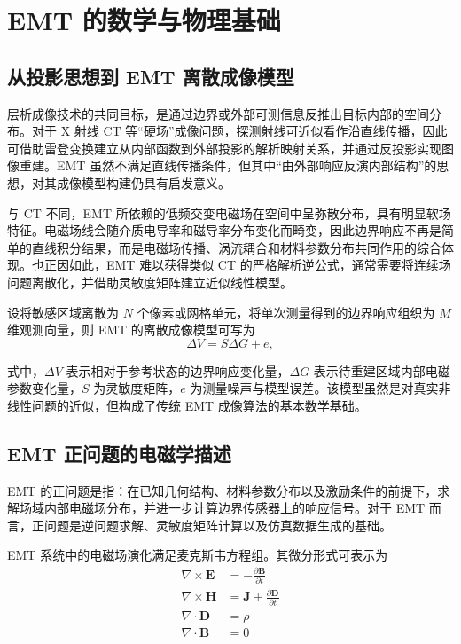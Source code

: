 \section{EMT 的数学与物理基础}

\subsection{从投影思想到 EMT 离散成像模型}

层析成像技术的共同目标，是通过边界或外部可测信息反推出目标内部的空间分布。对于 X 射线 CT 等“硬场”成像问题，探测射线可近似看作沿直线传播，因此可借助雷登变换建立从内部函数到外部投影的解析映射关系，并通过反投影实现图像重建\citep{radon20051}。EMT 虽然不满足直线传播条件，但其中“由外部响应反演内部结构”的思想，对其成像模型构建仍具有启发意义。

与 CT 不同，EMT 所依赖的低频交变电磁场在空间中呈弥散分布，具有明显软场特征。电磁场线会随介质电导率和磁导率分布变化而畸变，因此边界响应不再是简单的直线积分结果，而是电磁场传播、涡流耦合和材料参数分布共同作用的综合体现。也正因如此，EMT 难以获得类似 CT 的严格解析逆公式，通常需要将连续场问题离散化，并借助灵敏度矩阵建立近似线性模型。

设将敏感区域离散为 $N$ 个像素或网格单元，将单次测量得到的边界响应组织为 $M$ 维观测向量，则 EMT 的离散成像模型可写为
\begin{equation}
\label{eqn:EMT_linear}
\Delta V = S\Delta G + e ,
\end{equation}

式中，$\Delta V$ 表示相对于参考状态的边界响应变化量，$\Delta G$ 表示待重建区域内部电磁参数变化量，$S$ 为灵敏度矩阵，$e$ 为测量噪声与模型误差。该模型虽然是对真实非线性问题的近似，但构成了传统 EMT 成像算法的基本数学基础。

\subsection{EMT 正问题的电磁学描述}

EMT 的正问题是指：在已知几何结构、材料参数分布以及激励条件的前提下，求解场域内部电磁场分布，并进一步计算边界传感器上的响应信号。对于 EMT 而言，正问题是逆问题求解、灵敏度矩阵计算以及仿真数据生成的基础。

EMT 系统中的电磁场演化满足麦克斯韦方程组。其微分形式可表示为
\begin{align}
\label{eqn:maxwell_faraday}
\nabla \times \mathbf{E} &= -\frac{\partial \mathbf{B}}{\partial t} \\
\label{eqn:maxwell_ampere}
\nabla \times \mathbf{H} &= \mathbf{J} + \frac{\partial \mathbf{D}}{\partial t} \\
\label{eqn:maxwell_gauss_e}
\nabla \cdot \mathbf{D} &= \rho \\
\label{eqn:maxwell_gauss_b}
\nabla \cdot \mathbf{B} &= 0
\end{align}

